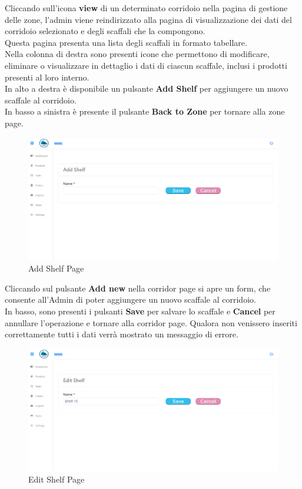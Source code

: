Cliccando sull'icona \textbf{view} di un determinato corridoio nella pagina di gestione delle zone,
l’admin viene reindirizzato alla pagina di visualizzazione dei dati del corridoio selezionato e degli scaffali che la compongono.\\
Questa pagina presenta una lista degli scaffali in formato tabellare.\\
Nella colonna di destra sono presenti icone che permettono di modificare, eliminare o visualizzare in dettaglio i dati di ciascun scaffale, inclusi i prodotti presenti al loro interno.\\
In alto a destra è disponibile un pulsante \textbf{Add Shelf} per aggiungere un nuovo scaffale al corridoio.\\
In basso a sinistra è presente il pulsante \textbf{Back to Zone} per tornare alla zone page.

\begin{figure}[H]
    \centering
    \includegraphics[width=\textwidth]{document/sections/img/Storyboard/addShelfPage.png}
    \caption{Add Shelf Page}
    \label{fig:addShelfPages}
\end{figure}

Cliccando sul pulsante \textbf{Add new} nella corridor page si apre un form, che consente
all'Admin di poter aggiungere un nuovo scaffale al corridoio.\\
In basso, sono presenti i pulsanti \textbf{Save} per salvare lo scaffale e \textbf{Cancel} per annullare l'operazione
e tornare alla corridor page.
Qualora non venissero inseriti correttamente tutti i dati verrà mostrato un messaggio di errore.

\begin{figure}[H]
    \centering
    \includegraphics[width=\textwidth]{document/sections/img/Storyboard/editShelfPage.png}
    \caption{Edit Shelf Page}
    \label{fig:editShelfPage}
\end{figure}

